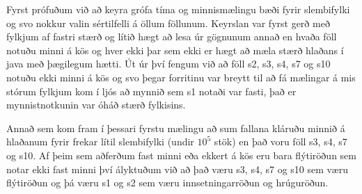 Fyrst prófuðum við að keyra grófa tíma og minnismælingu bæði fyrir slembifylki og svo nokkur valin sértilfelli  á öllum föllunum.
Keyrslan var fyrst gerð með fylkjum af fastri stærð og lítið hægt að lesa úr gögnunum annað en hvaða föll notuðu minni á kös og hver ekki þar sem ekki er hægt að mæla stærð hlaðans í java með þægilegum hætti.
Út úr  því fengum við að föll s2, s3, s4, s7 og s10 notuðu ekki minni á kös og svo þegar forritinu var breytt til að fá mælingar á mis stórum fylkjum kom í ljós að mynnið sem s1 notaði var fasti, það er mynnistnotkunin var óháð stærð fylkisins.

Annað sem kom fram í þessari fyrstu mælingu að sum fallana kláruðu minnið á hlaðanum fyrir frekar lítil slembifylki (undir $10^5$ stök)  en það voru föll s3, s4, s7 og  s10.
Af þeim sem aðferðum fast minni eða ekkert á kös eru bara flýtiröðun sem notar ekki fast minni því ályktuðum við að það væru s3, s4, s7 og  s10 sem væru flýtiröðun og þá væru s1 og s2 sem væru innsetningarröðun og hrúguröðun.


